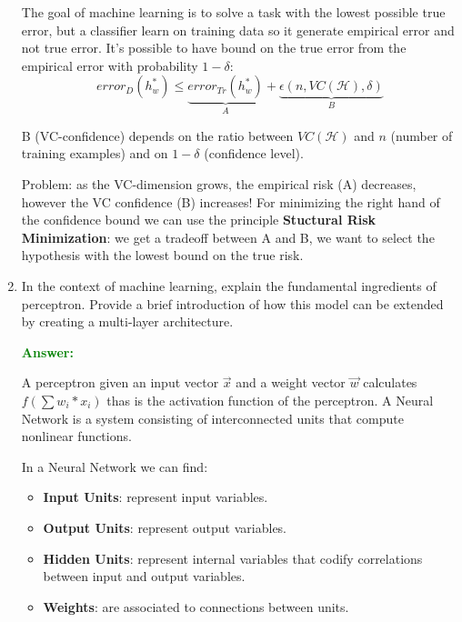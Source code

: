 \documentclass[12pt]{article}
\begin{document}
\begin{enumerate}[label=\textbf{ML.\arabic*}]
    The goal of machine learning is to solve a task with the lowest possible true error, but a classifier learn on training data so 
    it generate empirical error and not true error.
    It's possible to have bound on the true error from the empirical error with probability $1-\delta$:
    \begin{equation}\label{eq:confidence_interval}
        error_D(h^*_w) \leq \underbrace{error_{Tr}(h^*_w)}_A + \underbrace{\epsilon(n,VC(\mathcal{H}),\delta)}_B
    \end{equation}

    B (VC-confidence) depends on the ratio between $VC(\mathcal{H})$ and $n$ (number of training examples) and on $1- \delta$ (confidence level).

    Problem: as the VC-dimension grows, the empirical risk (A) decreases, however the VC confidence (B) increases!
    For minimizing the right hand of the confidence bound we can use the principle \textbf{Stuctural Risk Minimization}:
    we get a tradeoff between A and B, we want to select the hypothesis with the lowest bound on the true risk.



    \item In the context of machine learning, explain the fundamental ingredients of perceptron.
    Provide a brief introduction of how this model can be extended by creating a multi-layer architecture.

    \textcolor{green}{\textbf{Answer:}}

    A perceptron given an input vector $\vec{x}$ and a weight vector $\vec{w}$ calculates $f(\sum{w_i*x_i})$ thas is the activation function of the perceptron.
    A Neural Network is a system consisting of interconnected units that compute nonlinear functions.

    In a Neural Network we can find:
    \begin{itemize}
        \item \textbf{Input Units}: represent input variables.
        \item \textbf{Output Units}: represent output variables.
        \item \textbf{Hidden Units}: represent internal variables that codify correlations between input and output variables.
        \item \textbf{Weights}: are associated to connections between units.
    \end{itemize}


\end{enumerate}
\end{document}
